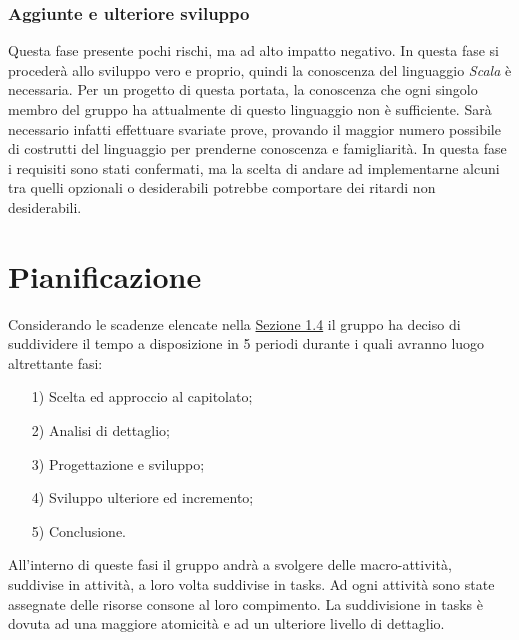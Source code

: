 \documentclass[a4paper]{article}
\begin{document}
			\subsubsection{Aggiunte e ulteriore sviluppo}
                Questa fase presente pochi rischi, ma ad alto impatto negativo. In questa fase si procederà allo sviluppo vero e proprio, quindi la conoscenza 
                del linguaggio \emph{Scala} è necessaria. Per un progetto di questa portata, la conoscenza che ogni singolo membro del gruppo ha attualmente di 
                questo linguaggio non è sufficiente. Sarà necessario infatti effettuare svariate prove, provando il maggior numero possibile di costrutti del 
                linguaggio per prenderne conoscenza e famigliarità. In questa fase i requisiti sono stati confermati, ma la scelta di andare ad implementarne 
                alcuni tra quelli opzionali o desiderabili potrebbe comportare dei ritardi non desiderabili.
                
				
				
	
	\newpage 
	\section{Pianificazione}
	
		Considerando le scadenze elencate nella \hyperref[Scadenze]{Sezione 1.4} il gruppo ha deciso di suddividere il tempo a disposizione in 5 
		periodi durante i quali avranno luogo altrettante fasi: 
		\begin{itemize}
			\item[1)] Scelta ed approccio al capitolato;
			\item[2)] Analisi di dettaglio;
			\item[3)] Progettazione e sviluppo;
			\item[4)] Sviluppo ulteriore ed incremento;
			\item[5)] Conclusione.
		\end{itemize}
		All'interno di queste fasi il gruppo andrà a svolgere delle macro-attività, suddivise in attività, a loro volta suddivise 
		in tasks. Ad ogni attività sono state assegnate delle risorse consone al loro compimento. La suddivisione in tasks è dovuta 
		ad una maggiore atomicità e ad un ulteriore livello di dettaglio.
		
\end{document}

